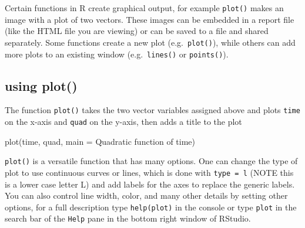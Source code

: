 \documentclass[
  letterpaper,
  DIV=11,
  numbers=noendperiod]{scrreprt}
\newenvironment{Shaded}{\begin{snugshade}}{\end{snugshade}}
\newcommand{\NormalTok}[1]{\textcolor[rgb]{0.00,0.23,0.31}{#1}}
\begin{document}
\begin{tcolorbox}[enhanced jigsaw, arc=.35mm, colframe=quarto-callout-tip-color-frame, left=2mm, opacitybacktitle=0.6, breakable, title=\textcolor{quarto-callout-tip-color}{\faLightbulb}\hspace{0.5em}{using vectors to plot}, toprule=.15mm, coltitle=black, bottomtitle=1mm, toptitle=1mm, colback=white, leftrule=.75mm, colbacktitle=quarto-callout-tip-color!10!white, titlerule=0mm, opacityback=0, rightrule=.15mm, bottomrule=.15mm]

Certain functions in R create graphical output, for example
\texttt{plot()} makes an image with a plot of two vectors. These images
can be embedded in a report file (like the HTML file you are viewing) or
can be saved to a file and shared separately. Some functions create a
new plot (e.g.~\texttt{plot()}), while others can add more plots to an
existing window (e.g.~\texttt{lines()} or \texttt{points()}).

\end{tcolorbox}

\hypertarget{using-plot}{%
\subsection*{using plot()}\label{using-plot}}

The function \texttt{plot()} takes the two vector variables assigned
above and plots \texttt{time} on the x-axis and \texttt{quad} on the
y-axis, then adds a title to the plot

\begin{Shaded}
\begin{Highlighting}[]
\NormalTok{plot(time, quad, main = \textquotesingle{}Quadratic function of time\textquotesingle{})}
\end{Highlighting}
\end{Shaded}

\texttt{plot()} is a versatile function that has many options. One can
change the type of plot to use continuous curves or lines, which is done
with \texttt{type\ =\ \textquotesingle{}l\textquotesingle{}} (NOTE this
is a lower case letter L) and add labels for the axes to replace the
generic labels. You can also control line width, color, and many other
details by setting other options, for a full description type
\texttt{help(plot)} in the console or type \texttt{plot} in the search
bar of the \texttt{Help} pane in the bottom right window of RStudio.
\end{document}
